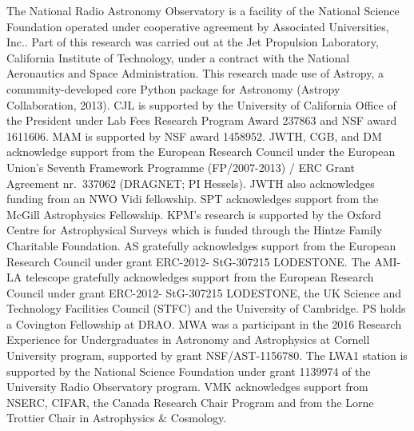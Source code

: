 \documentclass[twocolumn]{aastex61}
\begin{document}
The National Radio Astronomy Observatory is a facility of the National Science Foundation operated under cooperative agreement by Associated Universities, Inc..
Part of this research was carried out at the Jet Propulsion Laboratory, California Institute of Technology, under a contract with the National Aeronautics and Space Administration.
This research made use of Astropy, a community-developed core Python package for Astronomy (Astropy Collaboration, 2013).
CJL is supported by the University of California Office of the President under Lab Fees Research Program Award 237863 and NSF award 1611606. MAM is supported by NSF award 1458952. 
JWTH, CGB, and DM acknowledge support from the European Research Council under the European Union's Seventh Framework Programme (FP/2007-2013) / ERC Grant Agreement nr.\ 337062 (DRAGNET; PI Hessels). JWTH also acknowledges funding from an NWO Vidi fellowship.
SPT acknowledges support from the McGill Astrophysics Fellowship.
KPM's research is supported by the Oxford Centre for Astrophysical Surveys which is funded through the Hintze Family Charitable Foundation. AS gratefully acknowledges support from the European Research Council under grant ERC-2012- StG-307215 LODESTONE. The AMI-LA telescope gratefully acknowledges support from the European Research Council under grant ERC-2012- StG-307215 LODESTONE, the UK Science and Technology Facilities Council (STFC) and the University of Cambridge. 
PS holds a Covington Fellowship at DRAO. 
MWA was a participant in the 2016 Research Experience for Undergraduates in Astronomy and Astrophysics at Cornell University program, supported by grant NSF/AST-1156780.
The LWA1 station is supported by the National Science Foundation under grant 1139974 of the University Radio Observatory program.
VMK acknowledges support from NSERC, CIFAR, the Canada Research Chair Program and from the Lorne Trottier Chair in Astrophysics \& Cosmology.




\end{document}
